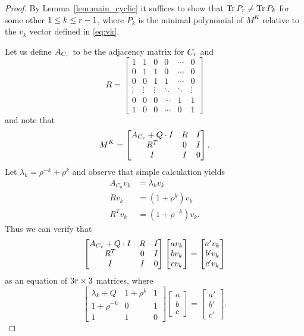 \documentclass[11pt]{article}
\theoremstyle{definition}
\numberwithin{equation}{section}
\newcommand\+{\mkern2mu}
\newcommand{\R}{\mathbb{R}}
\newcommand{\1}{\mathbf 1}
\DeclareMathOperator{\Tr}{Tr}
\begin{document}
\begin{proof}
By Lemma~\ref{lem:main_cyclic} it suffices to show that $\Tr P_{\ord} \neq \Tr P_k$ for some other $1 \leq k \leq r -1$, where $P_k$ is the minimal polynomial of $M^K$ relative to the $v_k$ vector defined in \eqref{eq:vk}.

Let us define $A_{C_r}$ to be the adjacency matrix for $C_r$ and \[R=\begin{bmatrix}1&1&0&0&\cdots& 0\\0&1&1&0&\cdots&0\\0&0&1&1&\cdots&0\\\vdots&\vdots&\vdots&\ddots&\ddots&\vdots\\0&0&0&\cdots&1&1\\1&0&0&\cdots&0&1\end{bmatrix}\] and note that 
\[M^K = \begin{bmatrix}A_{C_r}+Q\cdot I&R&I\\R^T&0&I\\I&I&0\end{bmatrix}.\]
Let $\lambda_k=\rho^{-k}+\rho^k$ and observe that simple calculation yields 
\begin{align*}
A_{C_n}v_k &= \lambda_k v_k\\
R v_k &= (1+\rho^k) v_k\\
R^T v_k &= (1+\rho^{-k}) v_k.
\end{align*}
Thus we can verify that 
\[
\begin{bmatrix}A_{C_r}+Q\cdot I&R&I\\R^T&0&I\\I&I&0\end{bmatrix}\begin{bmatrix}a v_k\\b v_k\\ c v_k\end{bmatrix}=\begin{bmatrix}a' v_k\\b ' v_k \\ c' v_k\end{bmatrix}
\]
as an equation of $3r \times 3$ matrices, where
\[
\begin{bmatrix}\lambda_k+Q&1+\rho^k&1\\1+\rho^{-k}&0&1\\1&1&0\end{bmatrix} \begin{bmatrix} a \\ b \\ c \end{bmatrix}= \begin{bmatrix}a' \\ b' \\ c' \end{bmatrix}.
\]


\end{proof}
\end{document}
